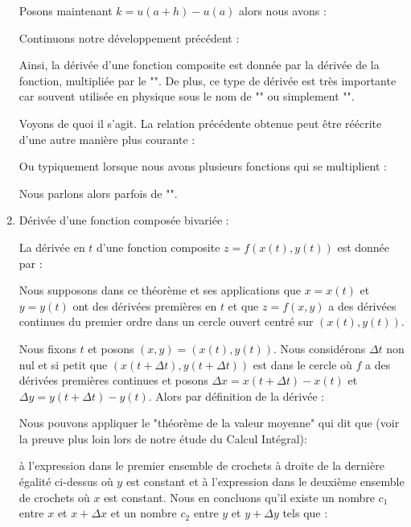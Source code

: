 \begin{enumerate}
		 Posons maintenant $k=u(a+h)-u(a)$ alors nous avons :
		  
		 Continuons notre développement précédent :
		  
		 Ainsi, la dérivée d'une fonction composite est donnée par la dérivée de la fonction, multipliée par le "". De plus, ce type de dérivée est très importante car souvent utilisée en physique sous le nom de "" ou simplement "".
		 
		 Voyons de quoi il s'agit. La relation précédente obtenue peut être réécrite d'une autre manière plus courante :
		 
			Ou typiquement lorsque nous avons plusieurs fonctions qui se multiplient :
		 
		 Nous parlons alors parfois de "".
		 
		 \item Dérivée d'une fonction composée bivariée :
		 \begin{theorem}
		 La dérivée en $t$ d'une fonction composite $z=f(x(t),y(t))$ est donnée par :
		  
		 Nous supposons dans ce théorème et ses applications que $x=x(t)$ et $y=y(t)$ ont des dérivées premières en $t$ et que $z=f(x,y)$ a des dérivées continues du premier ordre dans un cercle ouvert centré sur $(x(t),y(t))$.
		 \end{theorem}
		 \begin{dem}
		 	Nous fixons $t$ et posons $(x,y)=(x(t),y(t))$. Nous considérons $\Delta t$ non nul et si petit que $(x(t+\Delta t),y(t+\Delta t))$ est dans le cercle où $f$ a des dérivées premières continues et posons $\Delta x=x (t+\Delta t)-x(t)$ et $\Delta y=y(t+\Delta t)-y(t)$. Alors par définition de la dérivée :
		 	
			Nous pouvons appliquer le "théorème de la valeur moyenne" qui dit que (voir la preuve plus loin lors de notre étude du Calcul Intégral):
						
			 à l'expression dans le premier ensemble de crochets à droite de la dernière égalité ci-dessus où $y$ est constant et à l'expression dans le deuxième ensemble de crochets où $x$ est constant. Nous en concluons qu'il existe un nombre $c_1$ entre $x$ et $x+\Delta x$ et un nombre $c_2$ entre $y$ et $y+\Delta y$ tels que :
			

\end{dem}
\end{enumerate}
